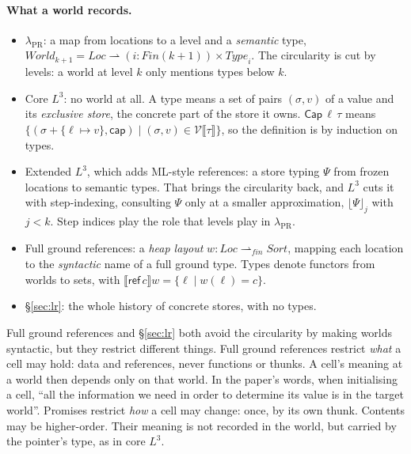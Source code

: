 \documentclass[11pt]{article}
\begin{document}
\paragraph{What a world records.}
\begin{itemize}
  \item $\lambda_{\mathrm{PR}}$: a map from locations to a level and a
    \emph{semantic} type, $\mathit{World}_{k+1} = \mathit{Loc}
    \rightharpoonup (i : \mathit{Fin}(k+1)) \times \mathit{Type}_i$. The
    circularity is cut by levels: a world at level $k$ only mentions types
    below $k$.
  \item Core $L^3$: no world at all. A type means a set of pairs $(\sigma, v)$
    of a value and its \emph{exclusive store}, the concrete part of the
    store it owns. $\mathsf{Cap}\,\ell\,\tau$ means
    $\{(\sigma + \{\ell \mapsto v\}, \mathsf{cap}) \mid (\sigma, v) \in
    \mathcal{V}\llbracket\tau\rrbracket\}$, so the definition is by
    induction on types.
  \item Extended $L^3$, which adds ML-style references: a store typing
    $\Psi$ from frozen locations to semantic types. That brings the
    circularity back, and $L^3$ cuts it with step-indexing, consulting
    $\Psi$ only at a smaller approximation, $\lfloor\Psi\rfloor_j$ with
    $j < k$. Step indices play the role that levels play in
    $\lambda_{\mathrm{PR}}$.
  \item Full ground references: a \emph{heap layout}
    $w : \mathit{Loc} \rightharpoonup_{\mathit{fin}} \mathit{Sort}$, mapping
    each location to the \emph{syntactic} name of a full ground type. Types
    denote functors from worlds to sets, with
    $\llbracket \mathsf{ref}\,c \rrbracket w = \{\ell \mid w(\ell) = c\}$.
  \item \S\ref{sec:lr}: the whole history of concrete stores, with no types.
\end{itemize}

Full ground references and \S\ref{sec:lr} both avoid the circularity by
making worlds syntactic, but they restrict different things. Full ground
references restrict \emph{what} a cell may hold: data and references, never
functions or thunks. A cell's meaning at a world then depends only on that
world. In the paper's words, when initialising a cell, ``all the information
we need in order to determine its value is in the target world''. Promises
restrict \emph{how} a cell may change: once, by its own thunk. Contents may be
higher-order. Their meaning is not recorded in the world, but carried by the
pointer's type, as in core $L^3$.
\end{document}
